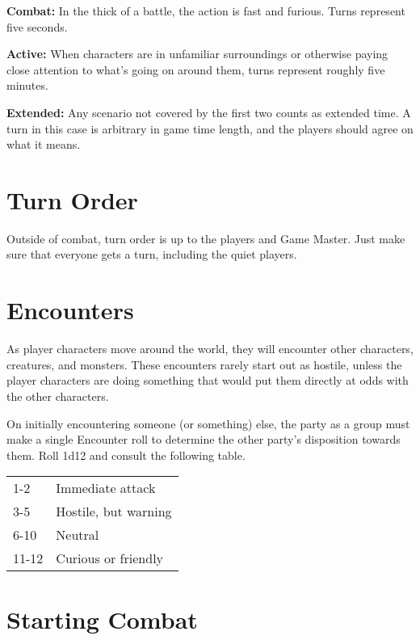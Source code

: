 \begin{multicols}{2}
\textbf{Combat:} In the thick of a battle, the action is fast and furious.
Turns represent five seconds.

\textbf{Active:} When characters are in unfamiliar surroundings or
otherwise paying close attention to what's going on around them, turns
represent roughly five minutes.

\textbf{Extended:} Any scenario not covered by the first two counts as
extended time. A turn in this case is arbitrary in game time length,
and the players should agree on what it means.

\section{Turn Order}

Outside of combat, turn order is up to the players and Game Master. Just
make sure that everyone gets a turn, including the quiet players.

\section{Encounters}

As player characters move around the world, they will encounter other
characters, creatures, and monsters. These encounters rarely start out
as hostile, unless the player characters are doing something that would
put them directly at odds with the other characters.

On initially encountering someone (or something) else, the party as a
group must make a single Encounter roll to determine the other party's
disposition towards them. Roll 1d12 and consult the following table.

\begin{center}
{
\begin{xtabular}{|l|l|}
1-2 & Immediate attack \\
3-5 & Hostile, but warning \\
6-10 &  Neutral \\
11-12 & Curious or friendly \\
\hline
\end{xtabular}
}
\end{center}

\section{Starting Combat}


\end{multicols}
